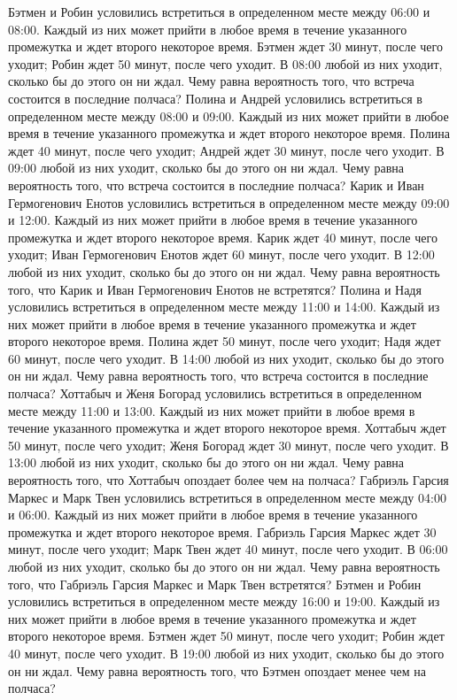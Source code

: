 Бэтмен и Робин условились встретиться в определенном месте между 06:00 и 08:00. Каждый из них может прийти в любое время в течение указанного промежутка и ждет второго некоторое время. Бэтмен ждет 30 минут, после чего уходит; Робин ждет 50 минут, после чего уходит. В 08:00 любой из них уходит, сколько бы до этого он ни ждал. Чему равна вероятность того, что встреча состоится в последние полчаса?
Полина и Андрей условились встретиться в определенном месте между 08:00 и 09:00. Каждый из них может прийти в любое время в течение указанного промежутка и ждет второго некоторое время. Полина ждет 40 минут, после чего уходит; Андрей ждет 30 минут, после чего уходит. В 09:00 любой из них уходит, сколько бы до этого он ни ждал. Чему равна вероятность того, что встреча состоится в последние полчаса?
Карик и Иван Гермогенович Енотов условились встретиться в определенном месте между 09:00 и 12:00. Каждый из них может прийти в любое время в течение указанного промежутка и ждет второго некоторое время. Карик ждет 40 минут, после чего уходит; Иван Гермогенович Енотов ждет 60 минут, после чего уходит. В 12:00 любой из них уходит, сколько бы до этого он ни ждал. Чему равна вероятность того, что Карик и Иван Гермогенович Енотов не встретятся?
Полина и Надя условились встретиться в определенном месте между 11:00 и 14:00. Каждый из них может прийти в любое время в течение указанного промежутка и ждет второго некоторое время. Полина ждет 50 минут, после чего уходит; Надя ждет 60 минут, после чего уходит. В 14:00 любой из них уходит, сколько бы до этого он ни ждал. Чему равна вероятность того, что встреча состоится в последние полчаса?
Хоттабыч и Женя Богорад условились встретиться в определенном месте между 11:00 и 13:00. Каждый из них может прийти в любое время в течение указанного промежутка и ждет второго некоторое время. Хоттабыч ждет 50 минут, после чего уходит; Женя Богорад ждет 30 минут, после чего уходит. В 13:00 любой из них уходит, сколько бы до этого он ни ждал. Чему равна вероятность того, что Хоттабыч опоздает более чем на полчаса?
Габриэль Гарсия Маркес и Марк Твен условились встретиться в определенном месте между 04:00 и 06:00. Каждый из них может прийти в любое время в течение указанного промежутка и ждет второго некоторое время. Габриэль Гарсия Маркес ждет 30 минут, после чего уходит; Марк Твен ждет 40 минут, после чего уходит. В 06:00 любой из них уходит, сколько бы до этого он ни ждал. Чему равна вероятность того, что Габриэль Гарсия Маркес и Марк Твен встретятся?
Бэтмен и Робин условились встретиться в определенном месте между 16:00 и 19:00. Каждый из них может прийти в любое время в течение указанного промежутка и ждет второго некоторое время. Бэтмен ждет 50 минут, после чего уходит; Робин ждет 40 минут, после чего уходит. В 19:00 любой из них уходит, сколько бы до этого он ни ждал. Чему равна вероятность того, что Бэтмен опоздает менее чем на полчаса?
